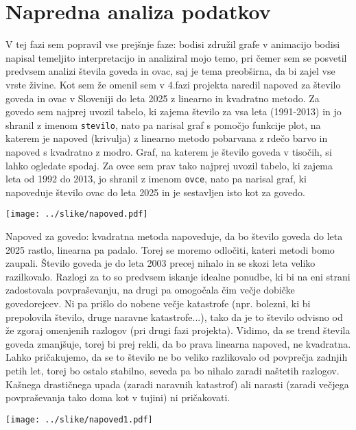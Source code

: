 \documentclass[11pt,a4paper]{article}
\begin{document}
\section{Napredna analiza podatkov}
V tej fazi sem popravil vse prejšnje faze: bodisi združil grafe v animacijo bodisi napisal temeljito interpretacijo in analiziral mojo temo, pri čemer sem se posvetil predvsem analizi števila goveda in ovac, saj je tema preobširna, da bi zajel vse vrste živine. Kot sem že omenil sem v 4.fazi projekta naredil napoved za število goveda in ovac v Sloveniji do leta 2025 z linearno in kvadratno metodo. Za govedo sem najprej uvozil tabelo, ki zajema število za vsa leta (1991-2013) in jo shranil z imenom \verb|stevilo|, nato pa narisal graf s pomočjo funkcije plot, na katerem je napoved (krivulja) z linearno metodo pobarvana z rdečo barvo in napoved s kvadratno z modro. Graf, na katerem je število goveda v tisočih, si lahko ogledate spodaj. Za ovce sem prav tako najprej uvozil tabelo, ki zajema leta od 1992 do 2013, jo shranil z imenom \verb|ovce|, nato pa narisal graf, ki napoveduje število ovac do leta 2025 in je sestavljen isto kot za govedo. 

\texttt{[image: ../slike/napoved.pdf]}

\noindent Napoved za govedo: kvadratna metoda napoveduje, da bo število goveda do leta 2025 rastlo, linearna pa padalo. Torej se moremo odločiti, kateri metodi bomo zaupali. Število goveda je do leta 2003 precej nihalo in se skozi leta veliko razilkovalo. Razlogi za to so predvsem iskanje idealne ponudbe, ki bi na eni strani zadostovala povpraševanju, na drugi pa omogočala čim večje dobičke govedorejcev. Ni pa prišlo do nobene večje katastrofe (npr. bolezni, ki bi prepolovila število, druge naravne katastrofe...), tako da je to število odvisno od že zgoraj omenjenih razlogov (pri drugi fazi projekta). Vidimo, da se trend števila goveda zmanjšuje, torej bi prej rekli, da bo prava linearna napoved, ne kvadratna. Lahko pričakujemo, da se to število ne bo veliko razlikovalo od povprečja zadnjih petih let, torej bo ostalo stabilno, seveda pa bo nihalo zaradi naštetih razlogov. Kašnega drastičnega upada (zaradi naravnih katastrof) ali narasti (zaradi večjega povpraševanja tako doma kot v tujini) ni pričakovati.

\texttt{[image: ../slike/napoved1.pdf]}
\end{document}
